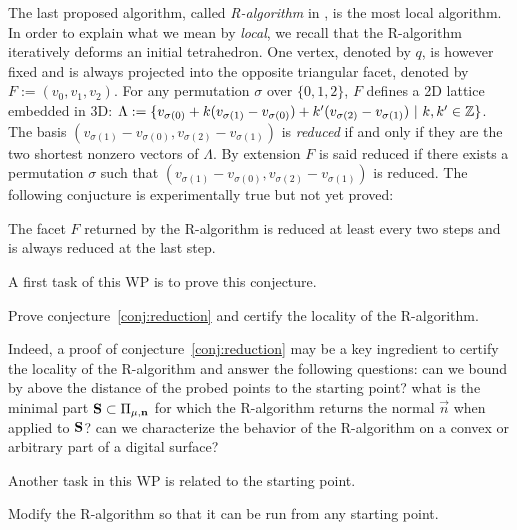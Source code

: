 The last proposed algorithm, called \emph{R-algorithm} in \cite{LPRJMIV2017}, is the most
local algorithm. In order to explain what we mean by \emph{local}, we recall that
the R-algorithm iteratively deforms an initial tetrahedron. One vertex, denoted by $q$,
is however fixed and is always projected into the opposite triangular facet, denoted by
$F := (v_0,v_1,v_2)$. For any permutation $\sigma$ over $\{0,1,2\}$, $F$ defines a 2D
lattice embedded in 3D:
$\Lambda := \{ v_{\sigma(0)} + k (v_{\sigma(1)}-v_{\sigma(0)}) + k' (v_{\sigma(2)}-v_{\sigma(1)}) \ | \ k,k' \in {\ensuremath\mathbb{Z}} \}$. 
The basis $(v_{\sigma(1)}-v_{\sigma(0)}, v_{\sigma(2)}-v_{\sigma(1)})$ is \emph{reduced} if and only
if they are the two shortest nonzero vectors of $\Lambda$. By extension $F$ is said reduced
if there exists a permutation $\sigma$ such that $(v_{\sigma(1)}-v_{\sigma(0)}, v_{\sigma(2)}-v_{\sigma(1)})$
is reduced. The following conjucture is experimentally true but not yet proved:

\begin{Conjecture}
  \label{conj:reduction}
  The facet $F$ returned by the R-algorithm is reduced at least every two steps and
  is always reduced at the last step.  
\end{Conjecture}

A first task of this WP is to prove this conjecture.
%
\begin{Task}
  \label{task:reduction}
  Prove conjecture~\ref{conj:reduction} and certify the locality of the R-algorithm. 
\end{Task}

Indeed, a proof of conjecture~\ref{conj:reduction} may be a key ingredient
to certify the locality of the R-algorithm and answer
the following questions: can we bound by above the distance of the probed
points to the starting point? 
what is the minimal part $\mathbf{S} \subset \Pi_{\mu,\mathbf{n}}$ for which the
R-algorithm returns the normal $\vec{n}$ when applied to $\mathbf{S}$?
can we characterize the behavior of the R-algorithm on a convex or arbitrary
part of a digital surface?

Another task in this WP is related to the starting point.
%
\begin{Task}
  \label{task:start}
  Modify the R-algorithm so that it can be run from any starting point. 
\end{Task}

